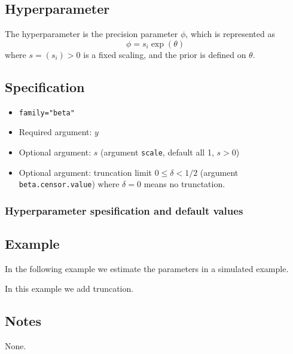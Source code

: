 \documentclass[a4paper,11pt]{article}
\begin{document}
\subsection*{Hyperparameter}

The hyperparameter is the precision parameter $\phi$, which is
represented as
\begin{displaymath}
    \phi = s_i \exp(\theta)
\end{displaymath}
where $s = (s_i) > 0$ is a fixed scaling, and the prior is defined on
$\theta$.

\subsection*{Specification}

\begin{itemize}
\item \texttt{family="beta"}
\item Required argument: $y$
\item Optional argument: $s$ (argument \texttt{scale}, default all 1, $s>0$)
\item Optional argument: truncation limit $0 \le \delta < 1/2$
    (argument \texttt{beta.censor.value}) where $\delta=0$ means no trunctation.
\end{itemize}

\subsubsection*{Hyperparameter spesification and default values}



\subsection*{Example}

In the following example we estimate the parameters in a simulated
example.


In this example we add truncation.


\subsection*{Notes}

None.
\end{document}

